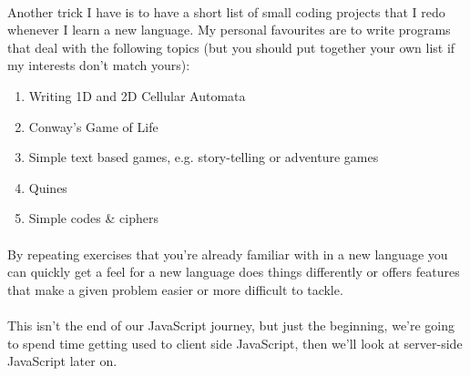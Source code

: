 \documentclass[10pt, a4paper, twosize]{article}
\begin{document}
\paragraph{} Another trick I have is to have a short list of small coding projects that I redo whenever I learn a new language. My personal favourites are to write programs that deal with the following topics (but you should put together your own list if my interests don't match yours):
\begin{enumerate}
\item Writing 1D and 2D Cellular Automata
\item Conway's Game of Life
\item Simple text based games, e.g. story-telling or adventure games
\item Quines
\item Simple codes \& ciphers
\end{enumerate}

\paragraph{} By repeating exercises that you're already familiar with in a new language you can quickly get a feel for a new language does things differently or offers features that make a given problem easier or more difficult to tackle.

\paragraph{} This isn't the end of our JavaScript journey, but just the beginning, we're going to spend time getting used to client side JavaScript, then we'll look at server-side JavaScript later on.
\end{document}
